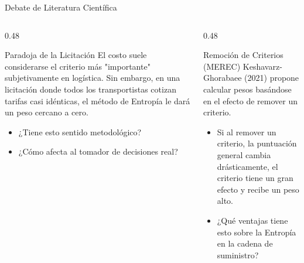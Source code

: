 \documentclass[aspectratio=169, 10pt]{beamer}
\begin{document}
\begin{frame}{Debate de Literatura Científica}
    \begin{columns}[T]
        \begin{column}{0.48\textwidth}
            \begin{block}{Paradoja de la Licitación}
                El costo suele considerarse el criterio más "importante" subjetivamente en logística. Sin embargo, en una licitación donde todos los transportistas cotizan tarifas casi idénticas, el método de Entropía le dará un peso cercano a cero. 
                \begin{itemize}
                    \scriptsize
                    \item ¿Tiene esto sentido metodológico?
                    \item ¿Cómo afecta al tomador de decisiones real?
                \end{itemize}
            \end{block}
        \end{column}
        
        \begin{column}{0.48\textwidth}
            \begin{exampleblock}{Remoción de Criterios (MEREC)}
                Keshavarz-Ghorabaee (2021) propone calcular pesos basándose en el efecto de remover un criterio.
                \begin{itemize}
                    \scriptsize
                    \item Si al remover un criterio, la puntuación general cambia drásticamente, el criterio tiene un gran efecto y recibe un peso alto.
                    \item ¿Qué ventajas tiene esto sobre la Entropía en la cadena de suministro?
                \end{itemize}
            \end{exampleblock}
        \end{column}
    \end{columns}
\end{frame}
\end{document}
